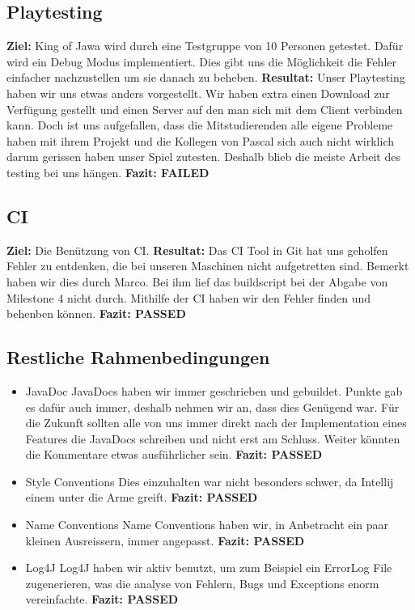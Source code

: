 \documentclass[]{scrartcl}
\newcommand{\n}{\newline}
\begin{document}
\subsection{Playtesting}
\textbf{Ziel:} King of Jawa wird durch eine Testgruppe von 10 Personen getestet. Dafür wird ein Debug Modus implementiert. Dies gibt uns die Möglichkeit die Fehler einfacher nachzustellen um sie danach zu beheben.\n
\textbf{Resultat:} Unser Playtesting haben wir uns etwas anders vorgestellt. Wir haben extra einen Download zur Verfügung gestellt und einen Server auf den man sich mit dem Client verbinden kann. Doch ist uns aufgefallen, dass die Mitstudierenden alle eigene Probleme haben mit ihrem Projekt und die Kollegen von Pascal sich auch nicht wirklich darum gerissen haben unser Spiel zutesten. Deshalb blieb die meiste Arbeit des testing bei uns hängen.\n
\textbf{Fazit: FAILED}
\subsection{CI}
\label{ssec:CI}
\textbf{Ziel: } Die Benützung von CI.\n
\textbf{Resultat:} Das CI Tool in Git hat uns geholfen Fehler zu entdenken, die bei unseren Maschinen nicht aufgetretten sind. Bemerkt haben wir dies durch Marco. Bei ihm lief das buildscript bei der Abgabe von Milestone 4 nicht durch. Mithilfe der CI haben wir den Fehler finden und behenben können.\n
\textbf{Fazit: PASSED}
\subsection{Restliche Rahmenbedingungen}
\begin{itemize}
	\item JavaDoc \n
	JavaDocs haben wir immer geschrieben und gebuildet. Punkte gab es dafür auch immer, deshalb nehmen wir an, dass dies Genügend war. Für die Zukunft sollten alle von uns immer direkt nach der Implementation eines Features die JavaDocs schreiben und nicht erst am Schluss. Weiter könnten die Kommentare etwas ausführlicher sein.\n
	\textbf{Fazit: PASSED}
	\item Style Conventions \n
	Dies einzuhalten war nicht besonders schwer, da Intellij einem unter die Arme greift.\n
	\textbf{Fazit: PASSED}
	\item Name Conventions \n
	Name Conventions haben wir, in Anbetracht ein paar kleinen Ausreissern, immer angepasst.\n
	\textbf{Fazit: PASSED}
	\item Log4J \n
	Log4J haben wir aktiv benutzt, um zum Beispiel ein ErrorLog File zugenerieren, was die analyse von Fehlern, Bugs und Exceptions enorm vereinfachte. \n
	\textbf{Fazit: PASSED}
\end{itemize}
\end{document}
